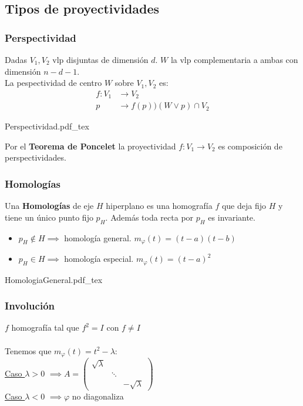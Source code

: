 \documentclass{myclass}
\newcommand{\incfig}[1]{%
  \def\svgwidth{0.9\columnwidth}
  {#1.pdf_tex}
}
\begin{document}
\subsection{Tipos de proyectividades}
\subsubsection{Perspectividad}
\begin{minipage}{0.7\textwidth}
Dadas  $V_1, V_2$ vlp disjuntas de dimensión $d$.  $W$ la vlp complementaria a ambas con dimensión  $n-d-1$.\\
La pespectividad de centro $W$ sobre  $V_1, V_2$ es:
\begin{align*}
  f: V_1 & \to V_2  \\
  p & \to f(p))(W\lor p)\cap V_2
\end{align*}
\end{minipage}  
\begin{minipage}{0.3\textwidth}
  \incfig{Perspectividad}
\end{minipage}
Por el \textbf{Teorema de Poncelet} la proyectividad $f: V_1\to V_2$ es composición de perspectividades.

\subsubsection{Homologías}
\begin{minipage}{0.7\textwidth}
Una \textbf{Homologías} de eje $H$ hiperplano es una homografía  $f$ que deja fijo  $H$ y tiene un único punto fijo $p_H$. Además toda recta por $p_H$ es invariante.
	 \begin{itemize}
	  \item $p_H\notin H \implies$ homología general. $m_\varphi(t) = (t-a)(t-b)$
	  \item $p_H\in H \implies$ homología especial. $m_\varphi (t) = (t-a)^2$
	\end{itemize}
\end{minipage}
\begin{minipage}{0.3\textwidth}
  \incfig{HomologiaGeneral} 
\end{minipage}

\subsubsection{Involución}
$f$ homografía tal que  $f^2 = I$ con  $f\neq  I$\\
\\
Tenemos que $m_\varphi(t) = t^2-\lambda$: \\
\underline{Caso $\lambda>0$} $\implies A = \begin{pmatrix} \sqrt{\lambda} & & \\ &  \ddots & \\ & & -\sqrt{\lambda}  \end{pmatrix} $  \\
\underline{Caso $\lambda<0$} $\implies \varphi $ no diagonaliza  
\end{document}
